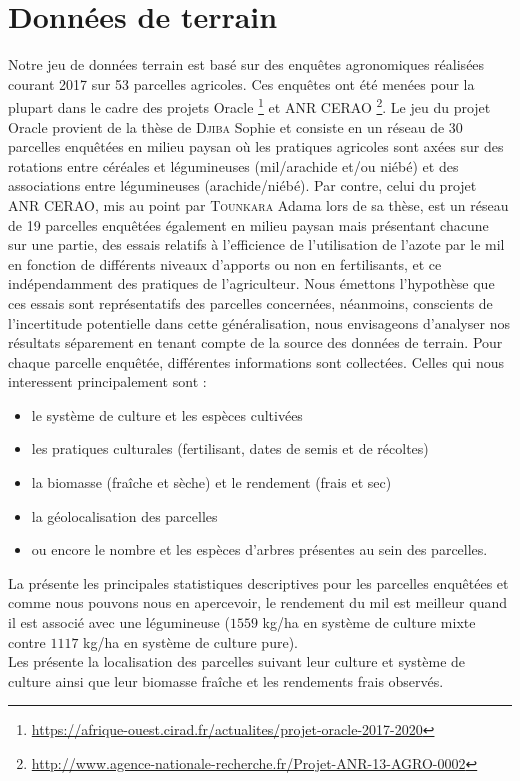 \section{Données de terrain}

Notre jeu de données terrain est basé sur des enquêtes agronomiques réalisées courant 2017 sur 53 parcelles agricoles. Ces enquêtes ont été menées pour la plupart dans le cadre des projets Oracle \footnote{\url{https://afrique-ouest.cirad.fr/actualites/projet-oracle-2017-2020}} et ANR CERAO \footnote{\url{http://www.agence-nationale-recherche.fr/Projet-ANR-13-AGRO-0002}}. Le jeu du projet Oracle provient de la thèse de \textsc{Djiba} Sophie et consiste en un réseau de 30 parcelles enquêtées en milieu paysan où les pratiques agricoles sont 
axées sur des rotations entre céréales et légumineuses (mil/arachide et/ou niébé) et des associations entre légumineuses (arachide/niébé). Par contre, celui du projet ANR CERAO, mis au point par \textsc{Tounkara} Adama lors de sa thèse, est un réseau de 19 parcelles enquêtées également en milieu paysan mais présentant chacune sur une partie, des essais relatifs à l'efficience de l'utilisation de l'azote par le mil en fonction de différents niveaux d'apports ou non en fertilisants, et ce indépendamment des pratiques de l'agriculteur. Nous émettons l'hypothèse que ces essais sont représentatifs des parcelles concernées, néanmoins, conscients de l'incertitude potentielle dans cette généralisation, nous envisageons d'analyser nos résultats séparement en tenant compte de la source des données de terrain. Pour chaque parcelle enquêtée, différentes informations sont collectées. Celles qui nous interessent principalement sont :
\begin{itemize}
 \item le système de culture et les espèces cultivées
 \item les pratiques culturales (fertilisant, dates de semis et de récoltes)
 \item la biomasse (fraîche et sèche) et le rendement (frais et sec)
 \item la géolocalisation des parcelles
 \item ou encore le nombre et les espèces d'arbres présentes au sein des parcelles.
\end{itemize}
La  présente les principales statistiques descriptives pour les parcelles enquêtées et comme nous pouvons nous en apercevoir, le rendement du mil est meilleur quand il est associé avec une légumineuse ($1559$ \si[per-mode=symbol]
{\kilogram\per\hectare} en système de culture mixte contre $1117$ \si[per-mode=symbol]
{\kilogram\per\hectare} en système de culture pure).
\\Les {} présente la localisation des parcelles suivant leur culture et système de culture ainsi que leur biomasse fraîche et les rendements frais observés.

